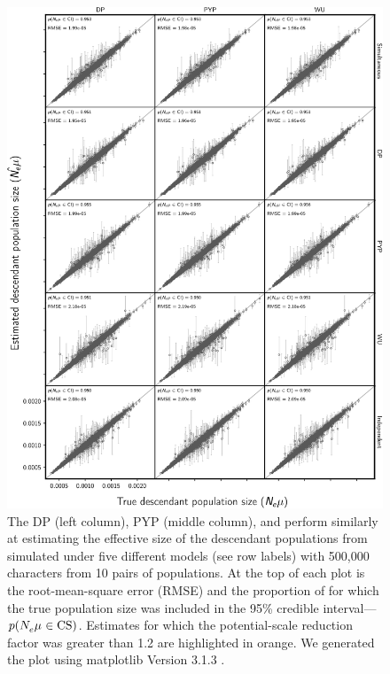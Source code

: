 
\begin{figure}[htbp]
    \begin{center}
        \includegraphics[width=\textwidth,height=0.9\textheight,keepaspectratio]{../images/from-project-repo/infer-columns-by-data-rows-descendant-size-scatter-cropped.pdf}
        \captionsetup{name=Figure S, labelformat=noSpace, listformat=sFigList}
        \caption{\footnotesize
        The DP (left column),
        PYP (middle column),
        and
        \wunif
        perform similarly at estimating the effective size of the
        descendant populations from \datasets simulated under five different
        models (see row labels) with 500,000 characters from 10 pairs of
        populations.
        At the top of each plot is the root-mean-square error (RMSE)
        and
        the proportion of \datasets for which the true population size was
        included in the 95\% credible interval---$p(N_{e}^{}\mu_{} \in
        \textrm{CS})$.
        Estimates for which the potential-scale reduction factor was greater
        than 1.2 \citep{Brooks1998} are highlighted in orange.
        We generated the plot using matplotlib Version 3.1.3
        \citep{matplotlib}.
        }
        \label{fig:descpopsizegrid}
    \end{center}
\end{figure}

